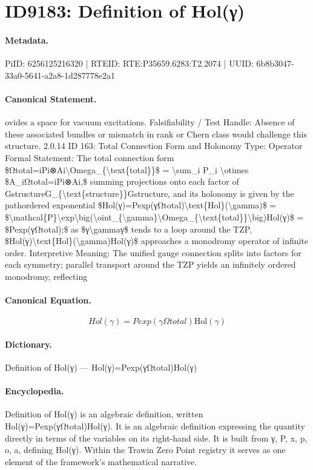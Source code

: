 \section*{ID9183: Definition of Hol(γ)}
\paragraph{Metadata.}
PiID: 6256125216320 | RTEID: RTE:P35659.6283:T2.2074 | UUID: 6b8b3047-33a0-5641-a2a8-1d287778e2a1

\paragraph{Canonical Statement.}
ovides a space for vacuum excitations. Falsifiability / Test Handle: Absence of these associated bundles or mismatch in rank or Chern class would challenge this structure. 2.0.14 ID 163: Total Connection Form and Holonomy Type: Operator Formal Statement: The total connection form \$Ωtotal=iPi⊗Ai\textbackslash{}Omega\_\{\textbackslash{}text\{total\}\}\$ = \textbackslash{}sum\_i P\_i \textbackslash{}otimes \$A\_iΩtotal=iPi⊗Ai,\$ summing projections onto each factor of GstructureG\_\{\textbackslash{}text\{structure\}\}Gstructure, and its holonomy is given by the pathordered exponential \$Hol(γ)=Pexp(γΩtotal)\textbackslash{}text\{Hol\}(\textbackslash{}gamma)\$ = \$\textbackslash{}mathcal\{P\}\textbackslash{}exp\textbackslash{}big(\textbackslash{}oint\_\{\textbackslash{}gamma\}\textbackslash{}Omega\_\{\textbackslash{}text\{total\}\}\textbackslash{}big)Hol(γ)\$ = \$Pexp(γΩtotal);\$ as \$γ\textbackslash{}gammaγ\$ tends to a loop around the TZP, \$Hol(γ)\textbackslash{}text\{Hol\}(\textbackslash{}gamma)Hol(γ)\$ approaches a monodromy operator of infinite order. Interpretive Meaning: The unified gauge connection splits into factors for each symmetry; parallel transport around the TZP yields an infinitely ordered monodromy, reflecting

\paragraph{Canonical Equation.}
\[
Hol(γ)=Pexp(γΩtotal)\text{Hol}(\gamma)
\]

\paragraph{Dictionary.}
Definition of Hol(γ) — Hol(γ)=Pexp(γΩtotal)Hol(γ)

\paragraph{Encyclopedia.}
Definition of Hol(γ) is an algebraic definition, written Hol(γ)=Pexp(γΩtotal)Hol(γ). It is an algebraic definition expressing the quantity directly in terms of the variables on its right-hand side. It is built from γ, P, x, p, o, a, defining Hol(γ). Within the Trawin Zero Point registry it serves as one element of the framework's mathematical narrative.
